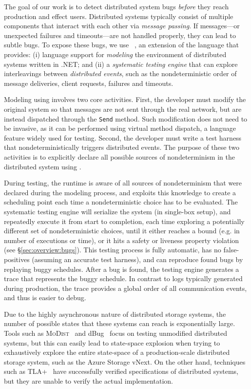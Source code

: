 The goal of our work is to detect distributed system bugs \emph{before} they reach production and effect users. Distributed systems typically consist of multiple components that interact with each other via \emph{message passing}. If messages---or unexpected failures and timeouts---are not handled properly, they can lead to subtle bugs. To expose these bugs, we use \psharp~\cite{deligiannis2015psharp}, an extension of the \csharp language that provides: (i) language support for \emph{modeling} the environment of distributed systems written in .NET; and (ii) a \emph{systematic testing engine} that can explore interleavings between \emph{distributed events}, such as the nondeterministic order of message deliveries, client requests, failures and timeouts.

Modeling using \psharp involves two core activities. First, the developer must modify the original system so that messages are not sent through the real network, but are instead dispatched through the \psharp \texttt{Send} method. Such modification does not need to be invasive, as it can be performed using virtual method dispatch, a \csharp language feature widely used for testing. Second, the developer must write a \psharp test harness that nondeterministically triggers distributed events. The purpose of these two activities is to explicitly declare all possible sources of nondeterminism in the distributed system using \psharp.

During testing, the \psharp runtime is aware of all sources of nondeterminism that were declared during the modeling process, and exploits this knowledge to create a scheduling point each time a nondeterministic choice has to be evaluated. The \psharp systematic testing engine will serialize the system (in single-box setup), and repeatedly execute it from start to completion, each time exploring a potentially different set of nondeterministic choices, until it either reaches a bound (e.g. in number of executions or time), or it hits a safety or liveness property violation (see \S\ref{sec:overview:bugs}). This testing process is fully automatic, has no false-positives (assuming an accurate test harness), and can reproduce found bugs by replaying buggy schedules. After a bug is found, the \psharp testing engine generates a trace that represents the buggy schedule. In contrast to logs typically generated during production, the \psharp trace provides a global order of all communication events, and thus is easier to debug.

Due to the highly asynchronous nature of distributed storage systems, the number of possible states that these systems can reach is exponentially large. Tools such as \textsc{MoDist}~\cite{yang2009modist} and dBug~\cite{simsa2011dbug} focus on testing unmodified distributed systems, but this can easily lead to state-space explosion when trying to exhaustively explore the entire state-space of a production-scale distributed storage system, such as the Azure Storage vNext. On the other hand, techniques such as TLA+~\cite{lamport1994temporal} have successfully verified specifications of distributed systems, but they are unable to verify the actual implementation.


